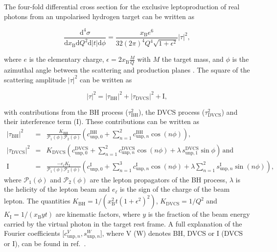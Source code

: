 \documentclass[11pt,a4paper]{article}
\begin{document}
The four-fold differential cross section for the exclusive leptoproduction of real photons
from an unpolarised hydrogen target can be written as \cite{Bel02b}
\begin{center}
\begin{equation}
\frac{\textrm{d}^4\sigma}{\textrm{d}x_{\textrm{B}}\textrm{d}Q^{2}\textrm{d}
|t|\textrm{d}\phi} =
\frac{x_{\textrm{B}}e^{6}}{32(2\pi)^{4} Q^{4}\sqrt{1+\epsilon^{2}}}
|\tau|^{2},
\end{equation}
\end{center}
where $e$ is the elementary
charge, $\epsilon=2x_\textrm{B}\frac{M}{Q}$ with $M$
the target mass, and $\phi$ is the
azimuthal angle between the scattering and production planes \cite{Tre04}.
The {square of the} scattering amplitude $|\tau|^2$ can be written as
\begin{center}
\begin{equation}
|\tau|^{2} = |\tau_{\textrm{BH}}|^{2} +
|\tau_{\textrm{DVCS}}|^{2} + \textrm{I},
\end{equation}
\end{center}
with contributions from the \textrm{BH} process ($\tau_{\textrm{BH}}^2$),
the DVCS process
($\tau_{\textrm{DVCS}}^2$) and their interference term (I). These
contributions can be written as
\begin{eqnarray}
 |\tau_{\textrm{BH}}|^{2} &=&
 \frac{K_{\textrm{BH}}}{\mathcal{P}_{1}(\phi)\mathcal{P}_{2}(\phi)} \left(c_{\textrm{unp},0}^{\textrm{BH}} + \sum_{n=1}^2
  c_{\textrm{unp},n}^{\textrm{BH}}\cos(n\phi)\right), \label{e:tbh}\\
|\tau_{\textrm{DVCS}}|^{2} &=&
K_{\textrm{DVCS}}\left(c_{\textrm{unp},0}^{\textrm{DVCS}} +
\sum_{n=1}^2
c_{\textrm{unp},n}^{\textrm{DVCS}}\cos(n\phi) + \lambda\,
s_{\textrm{unp},1}^{\textrm{DVCS}}\sin\phi\right)\,\textrm{and}
\label{e:tdvcs}\\
 \textrm{I} &=& \frac{- e_\ell
K_{\textrm{I}}}{\mathcal{P}_{1}(\phi)\mathcal{P}_{2}(\phi)}\left(c_{\textrm{unp},0}^{\textrm{
I}}+
\sum_{n=1}^3 c_{\textrm{unp},n}^{\textrm{I}}\cos(n\phi) + \lambda \sum_{n=1}^2
s_{\textrm{unp},n}^{\textrm{I}}\sin(n\phi)\right),\label{e:ti}
\end{eqnarray}
where $\mathcal{P}_1(\phi)$ and $\mathcal{P}_2(\phi)$ are the lepton propagators
of the BH process, $\lambda$ is the
helicity of the lepton beam and $e_\ell$ is the sign of the charge of
 the beam lepton.  The
quantities $K_{\textrm{BH}}=1/(x_\textrm{B}^2t(1+\epsilon^2)^2)$,
$K_{\textrm{DVCS}}=1/Q^2$
and $K_{\textrm{I}}=1/(x_{\textrm{B}}yt)$ are kinematic factors, where
$y$ is the fraction of the beam energy carried by the virtual photon in
the target rest frame. A full explanation of the Fourier coefficients [$c_{\textrm{unp},n}^V,s_{\textrm{unp},n}^W$], where V (W) denotes BH, DVCS or I (DVCS or I), can be found in ref.~\cite{Bel02b}.
 
\end{document}
